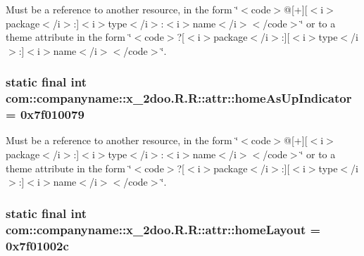 Must be a reference to another resource, in the form \char`\"{}$<$code$>$@\mbox{[}+\mbox{]}\mbox{[}$<$i$>$package$<$/i$>$:\mbox{]}$<$i$>$type$<$/i$>$:$<$i$>$name$<$/i$>$$<$/code$>$\char`\"{} or to a theme attribute in the form \char`\"{}$<$code$>$?\mbox{[}$<$i$>$package$<$/i$>$:\mbox{]}\mbox{[}$<$i$>$type$<$/i$>$:\mbox{]}$<$i$>$name$<$/i$>$$<$/code$>$\char`\"{}. \hypertarget{classcom_1_1companyname_1_1x__2doo_1_1_r_1_1attr_f60b6d313356916d6f1f95bacce2873a}{
\subsubsection[{homeAsUpIndicator}]{\setlength{\rightskip}{0pt plus 5cm}static final int com::companyname::x\_\-2doo.R.R::attr::homeAsUpIndicator = 0x7f010079}}
\label{classcom_1_1companyname_1_1x__2doo_1_1_r_1_1attr_f60b6d313356916d6f1f95bacce2873a}


Must be a reference to another resource, in the form \char`\"{}$<$code$>$@\mbox{[}+\mbox{]}\mbox{[}$<$i$>$package$<$/i$>$:\mbox{]}$<$i$>$type$<$/i$>$:$<$i$>$name$<$/i$>$$<$/code$>$\char`\"{} or to a theme attribute in the form \char`\"{}$<$code$>$?\mbox{[}$<$i$>$package$<$/i$>$:\mbox{]}\mbox{[}$<$i$>$type$<$/i$>$:\mbox{]}$<$i$>$name$<$/i$>$$<$/code$>$\char`\"{}. \hypertarget{classcom_1_1companyname_1_1x__2doo_1_1_r_1_1attr_132370e7961bf4fac4857ec68acf65b4}{
\subsubsection[{homeLayout}]{\setlength{\rightskip}{0pt plus 5cm}static final int com::companyname::x\_\-2doo.R.R::attr::homeLayout = 0x7f01002c}}
\label{classcom_1_1companyname_1_1x__2doo_1_1_r_1_1attr_132370e7961bf4fac4857ec68acf65b4}


